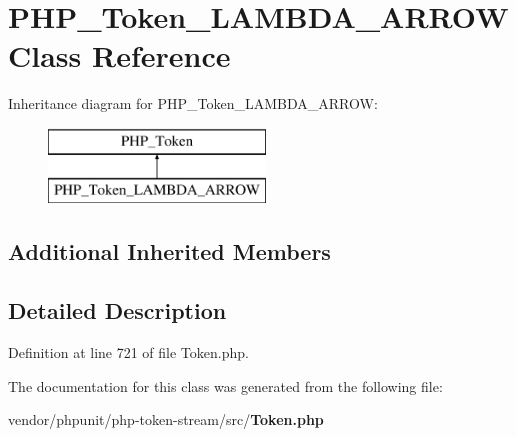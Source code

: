 \section{P\+H\+P\+\_\+\+Token\+\_\+\+L\+A\+M\+B\+D\+A\+\_\+\+A\+R\+R\+O\+W Class Reference}
\label{class_p_h_p___token___l_a_m_b_d_a___a_r_r_o_w}
Inheritance diagram for P\+H\+P\+\_\+\+Token\+\_\+\+L\+A\+M\+B\+D\+A\+\_\+\+A\+R\+R\+O\+W\+:\begin{figure}[H]
\begin{center}
\leavevmode
\includegraphics[height=2.000000cm]{class_p_h_p___token___l_a_m_b_d_a___a_r_r_o_w}
\end{center}
\end{figure}
\subsection*{Additional Inherited Members}


\subsection{Detailed Description}


Definition at line 721 of file Token.\+php.



The documentation for this class was generated from the following file\+:\begin{DoxyCompactItemize}
\item 
vendor/phpunit/php-\/token-\/stream/src/{\bf Token.\+php}\end{DoxyCompactItemize}
